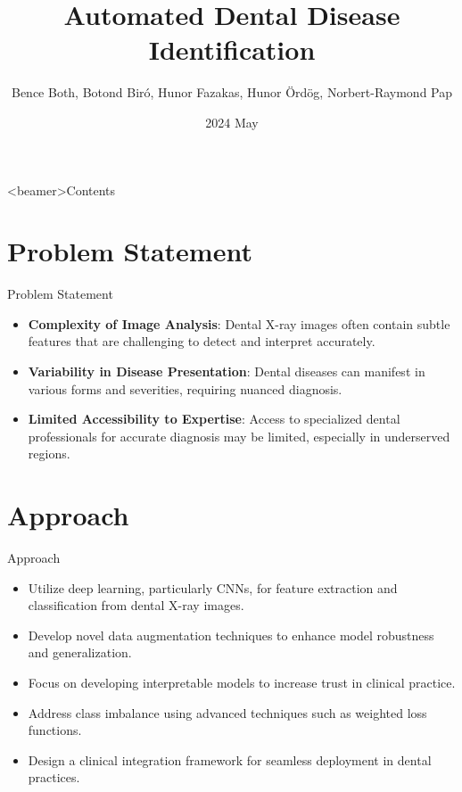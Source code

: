 \documentclass{beamer}
\title[Automated Dental Disease
Identification]{Automated Dental Disease
Identification}
\author{ Bence Both, Botond Biró, Hunor Fazakas, Hunor Ördög, Norbert-Raymond Pap}
\institute[UBB Cluj-Napoca]{
  Department of Mathematics and Informatics\\
  Babe{\c{s}}--Bolyai University, Cluj-Napoca}
\date{2024 May}
\begin{document}
\frame{\maketitle}

{

	{
  	\begin{frame}<beamer>{Contents}
    	\tableofcontents
  	\end{frame}
	}
}

\section[Problem Statement]{Problem Statement}

\begin{frame}{Problem Statement}
    \begin{itemize}
    \item \textbf{Complexity of Image Analysis}: Dental X-ray images often contain subtle features 
    that are challenging to detect and interpret accurately.
    \item \textbf{Variability in Disease Presentation}: Dental diseases can manifest in various forms and severities,
     requiring nuanced diagnosis.
    \item \textbf{Limited Accessibility to Expertise}: Access to specialized dental professionals for 
    accurate diagnosis may be limited, especially in underserved regions.
    \end{itemize}
\end{frame}

\section[Approach]{Approach}

\begin{frame}{Approach}
    \begin{itemize}
      \item Utilize deep learning, particularly CNNs, for feature extraction and classification from dental X-ray images.\cite{chen2021dental}
      \item Develop novel data augmentation techniques to enhance model robustness and generalization.\cite{lee2018detection}
      \item Focus on developing interpretable models to increase trust in clinical practice.\cite{setiabudi2017expert}
      \item Address class imbalance using advanced techniques such as weighted loss functions.\cite{litjens2017survey}
      \item Design a clinical integration framework for seamless deployment in dental practices.
    \end{itemize}
\end{frame}
\end{document}
